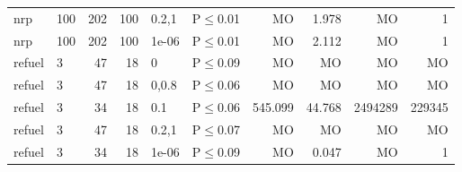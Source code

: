 \begin{longtable}{llrrllrrrr}
 nrp           & 100      &    	202 & 100 & 0.2,1 & P$\leq$0.01  & MO       & 1.978   & MO      & 1       \\
 nrp           & 100      &    	202 & 100 & 1e-06 & P$\leq$0.01  & MO       & 2.112   & MO      & 1       \\
 refuel        & 3        &     	47 &  18 & 0     & P$\leq$0.09  & MO       & MO      & MO      & MO      \\
 refuel        & 3        &     	47 &  18 & 0,0.8 & P$\leq$0.06  & MO       & MO      & MO      & MO      \\
 refuel        & 3        &     	34 &  18 & 0.1   & P$\leq$0.06  & 545.099  & 44.768  & 2494289 & 229345  \\
 refuel        & 3        &     	47 &  18 & 0.2,1 & P$\leq$0.07  & MO       & MO      & MO      & MO      \\
 refuel        & 3        &     	34 &  18 & 1e-06 & P$\leq$0.09  & MO       & 0.047   & MO      & 1       \\
\bottomrule
\end{longtable}

